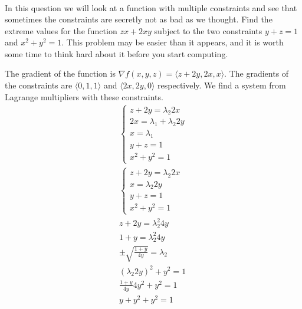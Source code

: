 \documentclass[12pt]{exam}
\begin{document}
\begin{questions}
\begin{parts}
\begin{solution}
\begin{gather*}
                \end{gather*}
            \end{solution}
    \end{parts}
\question In this question we will look at a function with multiple constraints and see that sometimes the constraints are secretly not as bad as we thought. Find the extreme values for the function $zx + 2xy$ subject to the two constraints $y + z = 1$ and $x^2 + y^2 = 1$. This problem may be easier than it appears, and it is worth some time to think hard about it before you start computing.
    \begin{solution}
        The gradient of the function is $\nabla f(x, y, z) = \langle z + 2y, 2x, x \rangle$. The gradients of the constraints are $\langle 0, 1, 1 \rangle$ and $\langle 2x, 2y, 0 \rangle$ respectively.
        We find a system from Lagrange multipliers with these constraints.
        \begin{gather*}
            \begin{cases*}
                z + 2y = \lambda_2 2x \\
                2x = \lambda_1 + \lambda_2 2y \\
                x = \lambda_1 \\
                y + z = 1 \\
                x^2 + y^2 = 1
            \end{cases*}\\
            \begin{cases*}
                z + 2y = \lambda_2 2x \\
                x = \lambda_2 2y \\
                y + z = 1 \\
                x^2 + y^2 = 1
            \end{cases*} \\
            z + 2y = \lambda_2^2 4y \\
            1 + y = \lambda_2^2 4y \\
            \pm \sqrt{\frac{1 + y}{4y}} = \lambda_2 \\
            (\lambda_2 2y)^2 + y^2 = 1 \\
            \frac{1 + y}{4y}4y^2 + y^2 = 1 \\
            y + y^2 + y^2 = 1\\

\end{gather*}
\end{solution}
\end{questions}
\end{document}
